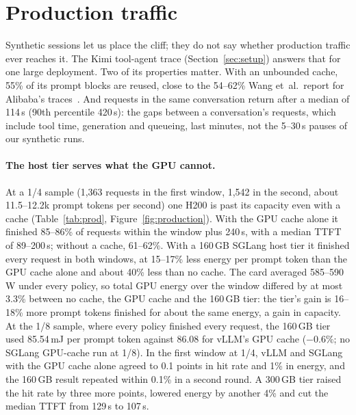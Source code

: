\section{Production traffic}
\label{sec:production}

Synthetic sessions let us place the cliff; they do not say whether production traffic ever reaches it. The Kimi
tool-agent trace (Section~\ref{sec:setup}) answers that for one large deployment. Two of its properties matter. With
an unbounded cache, 55\% of its prompt blocks are reused, close to the 54--62\% Wang et~al.\ report for Alibaba's
traces~\cite{wang2025kvcachewild}. And requests in the same conversation return after a median of 114\,s (90th
percentile 420\,s): the gaps between a conversation's requests, which include tool
time, generation and queueing, last minutes, not the 5--30\,s pauses of our synthetic runs.

\paragraph{The host tier serves what the GPU cannot.} At a 1/4 sample (1,363 requests in the first window, 1,542 in the
second, about 11.5--12.2k prompt tokens per second) one H200 is past its capacity even with a cache
(Table~\ref{tab:prod}, Figure~\ref{fig:production}). With the GPU cache alone it finished 85--86\% of requests within the window plus 240\,s, with a
median TTFT of 89--200\,s; without a cache, 61--62\%. With a 160\,GB SGLang host tier it finished
every request in both windows, at 15--17\% less energy per prompt token than the GPU cache alone and about 40\% less than
no cache. The card averaged 585--590\,W under every policy, so total GPU energy over the window differed by at most
3.3\% between no cache, the GPU cache and the 160\,GB tier: the tier's gain is 16--18\% more prompt tokens finished for about the same energy, a gain in capacity. At the
1/8 sample, where every policy finished every request, the 160\,GB tier used 85.54\,mJ per prompt token against 86.08
for vLLM's GPU cache ($-0.6\%$; no SGLang GPU-cache run at 1/8). In the first window at 1/4, vLLM and SGLang with the GPU cache alone agreed to 0.1 points in hit rate and 1\% in energy, and the 160\,GB result
repeated within 0.1\% in a second round. A 300\,GB tier raised the hit rate by three more points, lowered energy by
another 4\% and cut the median TTFT from 129\,s to 107\,s.

